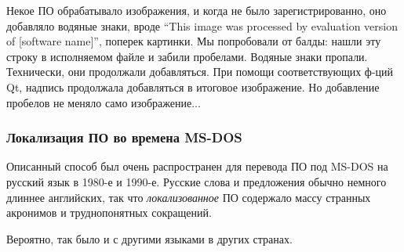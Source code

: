 Некое ПО обрабатывало изображения, и когда не было зарегистрированно, оно добавляло водяные знаки,
вроде ``This image was processed by evaluation version of [software name]'', поперек картинки.
Мы попробовали от балды: нашли эту строку в исполняемом файле и забили пробелами.
Водяные знаки пропали.
Технически, они продолжали добавляться.
При помощи соответствующих ф-ций Qt, надпись продолжала добавляться в итоговое изображение.
Но добавление пробелов не меняло само изображение...

\subsubsection{Локализация ПО во времена MS-DOS}

Описанный способ был очень распространен для перевода ПО под MS-DOS на русский язык в 1980-е и 1990-е.
Русские слова и предложения обычно немного длиннее английских, так что \emph{локализованное} ПО содержало
массу странных акронимов и труднопонятных сокращений.

Вероятно, так было и с другими языками в других странах.

